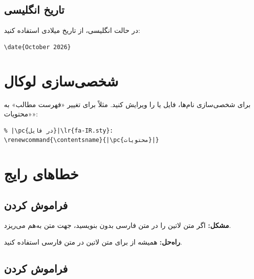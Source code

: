 
\subsection{تاریخ انگلیسی}
\label{sec:localization-dates-en}

در حالت انگلیسی، از تاریخ میلادی استفاده
کنید:

\begin{latin}
\begin{verbatim}
\date{October 2026}
\end{verbatim}
\end{latin}

\section{شخصی‌سازی لوکال}
\label{sec:localization-custom}

برای شخصی‌سازی نام‌ها، فایل 
یا  را ویرایش کنید. مثلاً
برای تغییر «فهرست مطالب» به «محتویات»:

\begin{latin}
\begin{verbatim}
% |\pc{در فایل}|\lr{fa-IR.sty}:
\renewcommand{\contentsname}{|\pc{محتویات}|}
\end{verbatim}
\end{latin}


\section{خطاهای رایج}
\label{sec:localization-mistakes}

\subsection{فراموش کردن }
\label{sec:localization-mistake-lr}

\textbf{مشکل:} اگر متن لاتین را در متن فارسی
بدون  بنویسید، جهت متن به‌هم
می‌ریزد.

\textbf{راه‌حل:} همیشه از  برای متن
لاتین در متن فارسی استفاده کنید.

\subsection{فراموش کردن }
\label{sec:localization-mistake-pnum}

